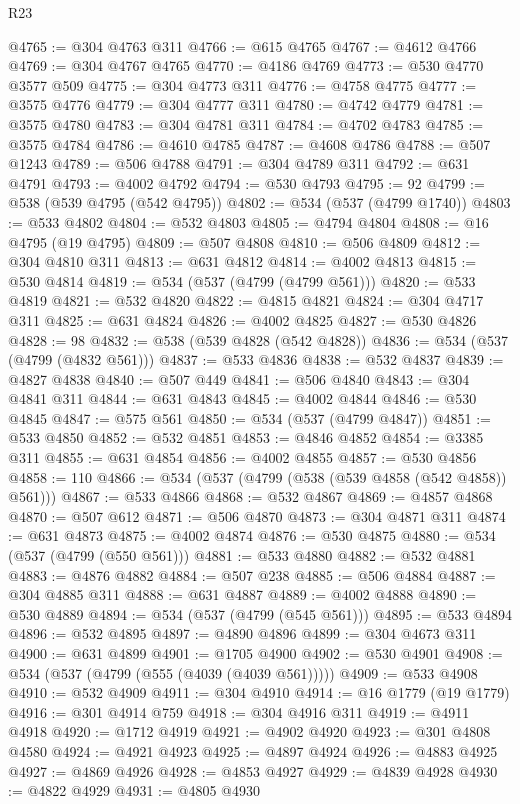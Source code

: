 \begin{lexlean}{R23}
\begin{coremodule}
@4765 := @304 @4763 @311
@4766 := @615 @4765
@4767 := @4612 @4766
@4769 := @304 @4767 @4765
@4770 := @4186 @4769
@4773 := @530 @4770 @3577 @509
@4775 := @304 @4773 @311
@4776 := @4758 @4775
@4777 := @3575 @4776
@4779 := @304 @4777 @311
@4780 := @4742 @4779
@4781 := @3575 @4780
@4783 := @304 @4781 @311
@4784 := @4702 @4783
@4785 := @3575 @4784
@4786 := @4610 @4785
@4787 := @4608 @4786
@4788 := @507 @1243
@4789 := @506 @4788
@4791 := @304 @4789 @311
@4792 := @631 @4791
@4793 := @4002 @4792
@4794 := @530 @4793
@4795 := 92
@4799 := @538 (@539 @4795 (@542 @4795))
@4802 := @534 (@537 (@4799 @1740))
@4803 := @533 @4802
@4804 := @532 @4803
@4805 := @4794 @4804
@4808 := @16 @4795 (@19 @4795)
@4809 := @507 @4808
@4810 := @506 @4809
@4812 := @304 @4810 @311
@4813 := @631 @4812
@4814 := @4002 @4813
@4815 := @530 @4814
@4819 := @534 (@537 (@4799 (@4799 @561)))
@4820 := @533 @4819
@4821 := @532 @4820
@4822 := @4815 @4821
@4824 := @304 @4717 @311
@4825 := @631 @4824
@4826 := @4002 @4825
@4827 := @530 @4826
@4828 := 98
@4832 := @538 (@539 @4828 (@542 @4828))
@4836 := @534 (@537 (@4799 (@4832 @561)))
@4837 := @533 @4836
@4838 := @532 @4837
@4839 := @4827 @4838
@4840 := @507 @449
@4841 := @506 @4840
@4843 := @304 @4841 @311
@4844 := @631 @4843
@4845 := @4002 @4844
@4846 := @530 @4845
@4847 := @575 @561
@4850 := @534 (@537 (@4799 @4847))
@4851 := @533 @4850
@4852 := @532 @4851
@4853 := @4846 @4852
@4854 := @3385 @311
@4855 := @631 @4854
@4856 := @4002 @4855
@4857 := @530 @4856
@4858 := 110
@4866 := @534 (@537 (@4799 (@538 (@539 @4858 (@542 @4858)) @561)))
@4867 := @533 @4866
@4868 := @532 @4867
@4869 := @4857 @4868
@4870 := @507 @612
@4871 := @506 @4870
@4873 := @304 @4871 @311
@4874 := @631 @4873
@4875 := @4002 @4874
@4876 := @530 @4875
@4880 := @534 (@537 (@4799 (@550 @561)))
@4881 := @533 @4880
@4882 := @532 @4881
@4883 := @4876 @4882
@4884 := @507 @238
@4885 := @506 @4884
@4887 := @304 @4885 @311
@4888 := @631 @4887
@4889 := @4002 @4888
@4890 := @530 @4889
@4894 := @534 (@537 (@4799 (@545 @561)))
@4895 := @533 @4894
@4896 := @532 @4895
@4897 := @4890 @4896
@4899 := @304 @4673 @311
@4900 := @631 @4899
@4901 := @1705 @4900
@4902 := @530 @4901
@4908 := @534 (@537 (@4799 (@555 (@4039 (@4039 @561)))))
@4909 := @533 @4908
@4910 := @532 @4909
@4911 := @304 @4910
@4914 := @16 @1779 (@19 @1779)
@4916 := @301 @4914 @759
@4918 := @304 @4916 @311
@4919 := @4911 @4918
@4920 := @1712 @4919
@4921 := @4902 @4920
@4923 := @301 @4808 @4580
@4924 := @4921 @4923
@4925 := @4897 @4924
@4926 := @4883 @4925
@4927 := @4869 @4926
@4928 := @4853 @4927
@4929 := @4839 @4928
@4930 := @4822 @4929
@4931 := @4805 @4930

\end{coremodule}
\end{lexlean}
